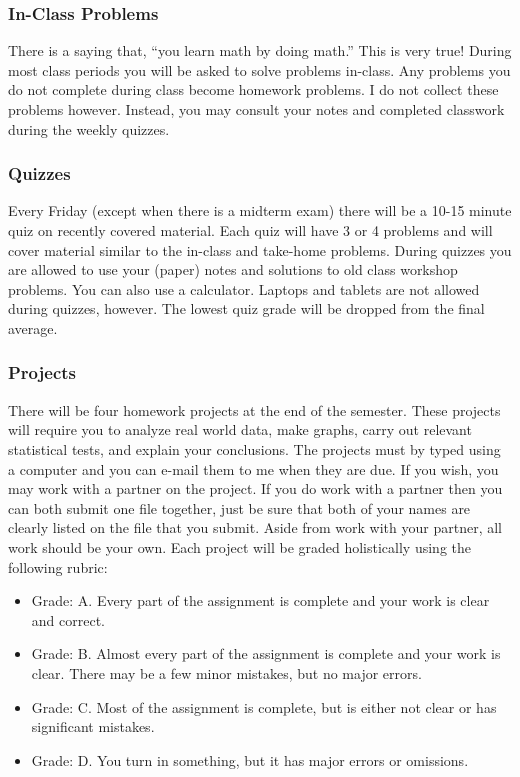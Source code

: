 \documentclass[10pt]{article}
\begin{document}
\subsubsection*{In-Class Problems}

There is a saying that, “you learn math by doing math.” This is very true! During most class periods you will be asked to solve problems in-class. Any problems you do not complete during class become homework problems. I do not collect these problems however. Instead, you may consult your notes and completed classwork during the weekly quizzes.


\subsubsection*{Quizzes}

Every Friday (except when there is a midterm exam) there will be a 10-15 minute quiz on recently covered material. Each quiz will have 3 or 4 problems and will cover material similar to the in-class and take-home problems. During quizzes you are allowed to use your (paper) notes and solutions to old class workshop problems. You can also use a calculator.  Laptops and tablets are not allowed during quizzes, however.  The lowest quiz grade will be dropped from the final average.  

\subsubsection*{Projects}

There will be four homework projects at the end of the semester. These projects will require you to analyze real world data, make graphs, carry out relevant statistical tests, and explain your conclusions. The projects must by typed using a computer and you can e-mail them to me when they are due. If you wish, you may work with a partner on the project. If you do work with a partner then you can both submit one file together, just be sure that both of your names are clearly listed on the file that you submit. Aside from work with your partner, all work should be your own. Each project will be graded holistically using the following rubric:

\begin{itemize}
\item Grade: A. Every part of the assignment is complete and your work is clear and correct.
\item Grade: B. Almost every part of the assignment is complete and your work is clear. There may be a few minor mistakes, but no major errors.
\item Grade: C. Most of the assignment is complete, but is either not clear or has significant mistakes.
\item Grade: D. You turn in something, but it has major errors or omissions.
\end{itemize}
\end{document}
